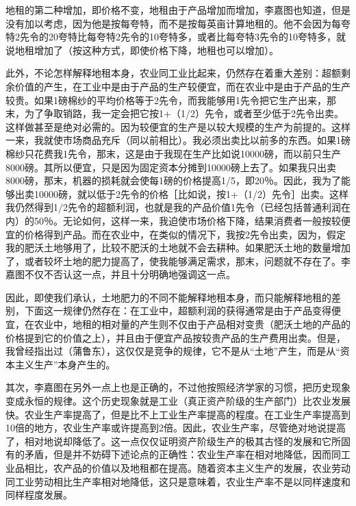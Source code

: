 地租的第二种增加，即价格不变，地租由于产品增加而增加，李嘉图也知道，但是没有加以考虑，因为他是按每夸特，而不是按每英亩计算地租的。他不会因为每夸特2先令的20夸特比每夸特2先令的10夸特多，或者比每夸特3先令的10夸特多，就说地租增加了（按这种方式，即使价格下降，地租也可以增加）。

此外，不论怎样解释地租本身，农业同工业比起来，仍然存在着重大差别：超额剩余价值的产生，在工业中是由于产品的生产较便宜，而在农业中是由于产品的生产较贵。如果1磅棉纱的平均价格等于2先令，而我能够用1先令把它生产出来，那末，为了争取销路，我一定会把它按1+（1/2）先令，或者至少低于2先令出卖。这样做甚至是绝对必需的。因为较便宜的生产是以较大规模的生产为前提的。这样一来，我就使市场商品充斥（同以前相比）。我必须出卖比以前多的东西。如果1磅棉纱只花费我1先令，那末，这是由于我现在生产比如说10000磅，而以前只生产8000磅。其所以便宜，只是因为固定资本分摊到10000磅上去了。如果我只出卖8000磅，那末，机器的损耗就会使每1磅的价格提高1/5，即20％。因此，我为了能够出卖10000磅，就以低于2先令的价格［比如说，按1+（1/2）先令］出卖。这样我仍然得到1/2先令的超额利润，也就是我的产品价值1先令（已经包括普通利润在内）的50％。无论如何，这样一来，我迫使市场价格下降，结果消费者一般按较便宜的价格得到产品。而在农业中，在类似的情况下，我按2先令出卖，因为，假定我的肥沃土地够用了，比较不肥沃的土地就不会去耕种。如果肥沃土地的数量增加了，或者较坏土地的肥力提高了，使我能够满足需求，那末，问题就不存在了。李嘉图不仅不否认这一点，并且十分明确地强调这一点。

因此，即使我们承认，土地肥力的不同不能解释地租本身，而只能解释地租的差别，下面这一规律仍然存在：在工业中，超额利润的获得通常是由于产品变得便宜，在农业中，地租的相对量的产生则不仅由于产品相对变贵（肥沃土地的产品的价格提到它的价值之上），并且由于便宜产品按较贵产品的生产费用出卖。但是，我曾经指出过（蒲鲁东），这仅仅是竞争的规律，它不是从“土地”产生，而是从“资本主义生产”本身产生的。

其次，李嘉图在另外一点上也是正确的，不过他按照经济学家的习惯，把历史现象变成永恒的规律。这个历史现象就是工业（真正资产阶级的生产部门）比农业发展快。农业生产率提高了，但是比不上工业生产率提高的程度。在工业生产率提高到10倍的地方，农业生产率或许提高到2倍。因此，农业生产率，尽管绝对地说提高了，相对地说却降低了。这一点仅仅证明资产阶级生产的极其古怪的发展和它所固有的矛盾，但是并不妨碍下述论点的正确性：农业生产率在相对地降低，因而同工业品相比，农产品的价值以及地租都在提高。随着资本主义生产的发展，农业劳动同工业劳动相比生产率相对地降低，这只是意味着，农业生产率不是以同样速度和同样程度发展。

